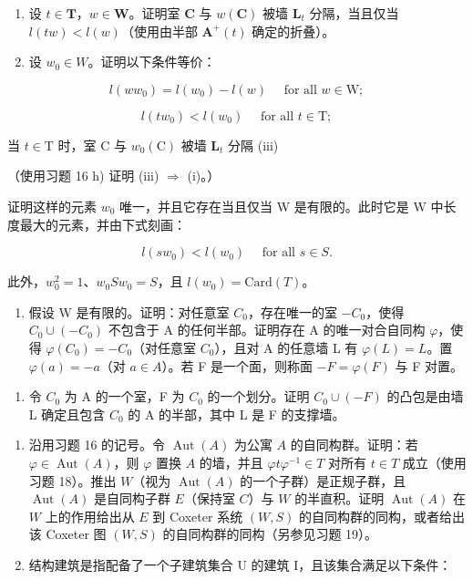 \begin{enumerate}
\def\labelenumi{\alph{enumi})}
\item
  设 \(t \in \mathbf{T}\)，\(w \in \mathbf{W}\)。证明室 \(\mathbf{C}\) 与 \(w(\mathbf{C})\) 被墙 \(\mathbf{L}_t\) 分隔，当且仅当 \(l(tw) < l(w)\)（使用由半部 \(\mathbf{A}^+(t)\) 确定的折叠）。
\item
  设 \(w_0 \in W\)。证明以下条件等价：
\end{enumerate}

\[
l (w w _ {0}) = l (w _ {0}) - l (w) \quad \text {   for   all   } w \in \mathrm{W};\tag{i}
\]

\[
l (t w _ {0}) <   l (w _ {0}) \quad \text {   for   all   } t \in \mathrm{T};\tag{ii}
\]

当 \(t \in \mathrm{T}\) 时，室 \(\mathrm{C}\) 与 \(w_0(\mathrm{C})\) 被墙 \(\mathbf{L}_t\) 分隔 (iii)

（使用习题 16 h) 证明 (iii) \(\Longrightarrow\) (i)。）

证明这样的元素 \(w_{0}\) 唯一，并且它存在当且仅当 W 是有限的。此时它是 W 中长度最大的元素，并由下式刻画：

\[
l (s w _ {0}) <   l (w _ {0}) \quad \text {   for   all   } s \in S.\tag{iv}
\]

此外，\(w_0^2 = 1\)、\(w_0Sw_0 = S\)，且 \(l(w_0) = \mathrm{Card}(T)\)。

\begin{enumerate}
\def\labelenumi{(\alph{enumi})}
\setcounter{enumi}{2}
\tightlist
\item
  假设 W 是有限的。证明：对任意室 \(C_{0}\)，存在唯一的室 \(-C_{0}\)，使得 \(C_{0} \cup (-C_{0})\) 不包含于 A 的任何半部。证明存在 A 的唯一对合自同构 \(\varphi\)，使得 \(\varphi(C_{0}) = -C_{0}\)（对任意室 \(C_{0}\)），且对 A 的任意墙 L 有 \(\varphi(L) = L\)。置 \(\varphi(a) = -a\)（对 \(a \in A\)）。若 F 是一个面，则称面 \(-F = \varphi(F)\) 与 F 对置。
\end{enumerate}

\begin{enumerate}
\def\labelenumi{\alph{enumi})}
\setcounter{enumi}{3}
\tightlist
\item
  令 \(C_{0}\) 为 A 的一个室，F 为 \(C_{0}\) 的一个划分。证明 \(C_{0} \cup (-F)\) 的凸包是由墙 L 确定且包含 \(C_{0}\) 的 A 的半部，其中 L 是 F 的支撑墙。
\end{enumerate}

\begin{enumerate}
\def\labelenumi{\arabic{enumi})}
\setcounter{enumi}{22}
\item
  沿用习题 16 的记号。令 \(\operatorname{Aut}(A)\) 为公寓 \(A\) 的自同构群。证明：若 \(\varphi \in \operatorname{Aut}(A)\)，则 \(\varphi\) 置换 \(A\) 的墙，并且 \(\varphi t\varphi^{-1} \in T\) 对所有 \(t \in T\) 成立（使用习题 18）。推出 \(W\)（视为 \(\operatorname{Aut}(A)\) 的一个子群）是正规子群，且 \(\operatorname{Aut}(A)\) 是自同构子群 \(E\)（保持室 \(C\)）与 \(W\) 的半直积。证明 \(\operatorname{Aut}(A)\) 在 \(W\) 上的作用给出从 \(E\) 到 Coxeter 系统 \((W, S)\) 的自同构群的同构，或者给出该 Coxeter 图 \((W, S)\) 的自同构群的同构（另参见习题 19）。
\item
  结构建筑是指配备了一个子建筑集合 U 的建筑 I，且该集合满足以下条件：
\end{enumerate}

